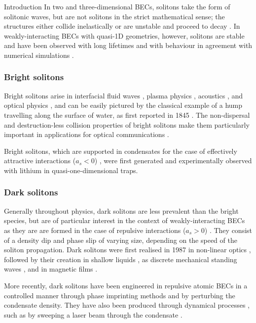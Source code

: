\begin{chapter}{\label{cha:bose_gases}Introduction}
In two and three-dimensional BECs, solitons take the form of solitonic waves, but are not solitons in the strict mathematical sense; the structures either collide inelastically or are unstable and proceed to decay \cite{Burger99,PhysRevA.62.053606,PhysRevA.65.043612,Tikhonenko96}. In weakly-interacting BECs with quasi-1D geometries, however, solitons are stable and have been observed with long lifetimes and with behaviour in agreement with numerical simulations \cite{PhysRevLett.101.120406}.

\subsubsection{Bright solitons}
Bright solitons arise in interfacial fluid waves \cite{Russell45}, plasma physics \cite{PhysRevLett.37.693,PhysRevLett.33.886}, acoustics \cite{naugolnykh1998nonlinear}, and optical physics \cite{agrawal2001nonlinear}, and can be easily pictured by the classical example of a hump travelling along the surface of water, as first reported in 1845 \cite{Russell45}. The non-dispersal and destruction-less collision properties of bright solitons make them particularly important in applications for optical communications \cite{hasegawa1995solitons}.

Bright solitons, which are supported in condensates for the case of effectively attractive interactions ($a_s < 0$) \cite{PhysRevA.62.063611}, were first generated and experimentally observed with lithium \cite{Strecker02,Khaykovich1290} in quasi-one-dimensional traps.

\subsubsection{Dark solitons}
Generally throughout physics, dark solitons are less prevalent than the bright species, but are of particular interest in the context of weakly-interacting BECs as they are are formed in the case of repulsive interactions ($a_s > 0$) \cite{PhysRevA.62.063610}. They consist of a density dip and phase slip \cite{dodd1982solitons} of varying size, depending on the speed of the soliton propagation. Dark solitons were first realised in 1987 in non-linear optics \cite{Emplit87}, followed by their creation in shallow liquids \cite{PhysRevLett.64.1518}, as discrete mechanical standing waves \cite{PhysRevLett.68.1730}, and in magnetic films \cite{PhysRevLett.70.1707}.

More recently, dark solitons have been engineered in repulsive atomic BECs in a controlled manner through phase imprinting methods \cite{Denschlag97,Burger99,PhysRevLett.86.2926,PhysRevLett.101.120406} and by perturbing the condensate density. They have also been produced through dynamical processes \cite{Weller08,PhysRevLett.99.160405}, such as by sweeping a laser beam through the condensate \cite{PhysRevLett.99.160405}. 


\end{chapter}
